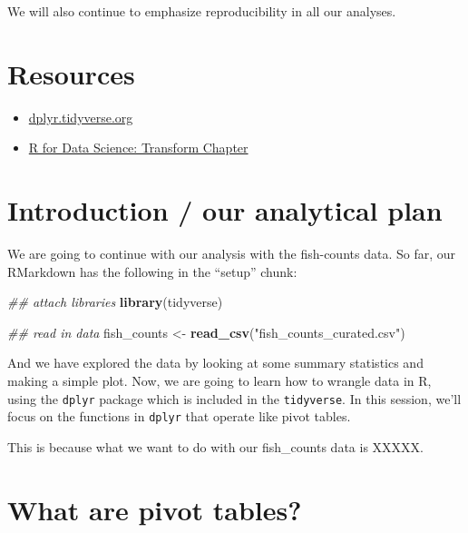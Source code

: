 \documentclass[]{book}
\newenvironment{Shaded}{\begin{snugshade}}{\end{snugshade}}
\newcommand{\CommentTok}[1]{\textcolor[rgb]{0.56,0.35,0.01}{\textit{#1}}}
\newcommand{\KeywordTok}[1]{\textcolor[rgb]{0.13,0.29,0.53}{\textbf{#1}}}
\newcommand{\NormalTok}[1]{#1}
\newcommand{\StringTok}[1]{\textcolor[rgb]{0.31,0.60,0.02}{#1}}
\providecommand{\tightlist}{%
  \setlength{\itemsep}{0pt}\setlength{\parskip}{0pt}}
\begin{document}
We will also continue to emphasize reproducibility in all our analyses.

\hypertarget{resources-3}{%
\section{Resources}\label{resources-3}}

\begin{itemize}
\tightlist
\item
  \href{https://dplyr.tidyverse.org/}{dplyr.tidyverse.org}
\item
  \href{https://r4ds.had.co.nz/transform.html}{R for Data Science: Transform Chapter}
\end{itemize}

\hypertarget{introduction-our-analytical-plan}{%
\section{Introduction / our analytical plan}\label{introduction-our-analytical-plan}}

We are going to continue with our analysis with the fish-counts data. So far, our RMarkdown has the following in the ``setup'' chunk:

\begin{Shaded}
\begin{Highlighting}[]
\CommentTok{## attach libraries}
\KeywordTok{library}\NormalTok{(tidyverse)}

\CommentTok{## read in data}
\NormalTok{fish_counts <-}\StringTok{ }\KeywordTok{read_csv}\NormalTok{(}\StringTok{"fish_counts_curated.csv"}\NormalTok{)}
\end{Highlighting}
\end{Shaded}

And we have explored the data by looking at some summary statistics and making a simple plot. Now, we are going to learn how to wrangle data in R, using the \texttt{dplyr} package which is included in the \texttt{tidyverse}. In this session, we'll focus on the functions in \texttt{dplyr} that operate like pivot tables.

This is because what we want to do with our fish\_counts data is XXXXX.

\hypertarget{what-are-pivot-tables}{%
\section{What are pivot tables?}\label{what-are-pivot-tables}}
\end{document}
